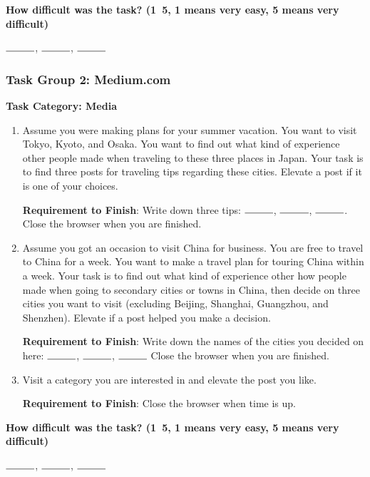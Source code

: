 \textbf{How difficult was the task? (1~5, 1 means very easy, 5 means very difficult)}

$\rule{1cm}{0.15mm}$, $\rule{1cm}{0.15mm}$, $\rule{1cm}{0.15mm}$

\subsubsection{Task Group 2: Medium.com}

\textbf{Task Category: Media}

\begin{enumerate}
    \item Assume you were making plans for your summer vacation. You want to visit Tokyo, Kyoto, and Osaka. 
          You want to find out what kind of experience other people made 
          when traveling to these three places in Japan. Your task is to find three posts 
          for traveling tips regarding these cities. Elevate a post if it is one of your choices.

          \textbf{Requirement to Finish}: Write down three tips: $\rule{1cm}{0.15mm}$, $\rule{1cm}{0.15mm}$, $\rule{1cm}{0.15mm}$.
          Close the browser when you are finished.

          \item Assume you got an occasion to visit China for business. You are free to travel to China for a week. 
          You want to make a travel plan for touring China within a week. Your task is to find out what kind 
          of experience other how people made when going to secondary cities or towns in China, then decide 
          on three cities you want to visit (excluding  Beijing, Shanghai, Guangzhou, and Shenzhen). 
          Elevate if a post helped you make a decision. 

          \textbf{Requirement to Finish}: Write down the names of the cities you decided on here: $\rule{1cm}{0.15mm}$, $\rule{1cm}{0.15mm}$, $\rule{1cm}{0.15mm}$
          Close the browser when you are finished.

    \item Visit a category you are interested in and elevate the post you like. 
    
          \textbf{Requirement to Finish}: Close the browser when time is up.
\end{enumerate}

\textbf{How difficult was the task? (1~5, 1 means very easy, 5 means very difficult)}

$\rule{1cm}{0.15mm}$, $\rule{1cm}{0.15mm}$, $\rule{1cm}{0.15mm}$

